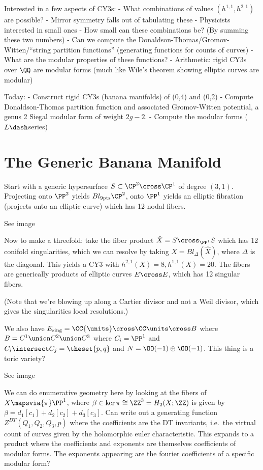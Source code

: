 Interested in a few aspects of CY3s: - What combinations of values
\((h^{1,1}, h^{2,1})\) are possible? - Mirror symmetry falls out of
tabulating these - Physicists interested in small ones - How small can
these combinations be? (By summing these two numbers) - Can we compute
the Donaldson-Thomas/Gromov-Witten/``string partition functions''
(generating functions for counts of curves) - What are the modular
properties of these functions? - Arithmetic: rigid CY3s over \(\QQ\) are
modular forms (much like Wile's theorem showing elliptic curves are
modular)

Today: - Construct rigid CY3s (banana manifolds) of (0,4) and (0,2) -
Compute Donaldson-Thomas partition function and associated Gromov-Witten
potential, a genus 2 Siegal modular form of weight \(2g-2\). - Compute
the modular forms (\(L\dash\)series)

\hypertarget{the-generic-banana-manifold}{%
\section{The Generic Banana
Manifold}\label{the-generic-banana-manifold}}

Start with a generic hypersurface \(S \subset \CP^2\cross \CP^1\) of
degree \((3,1)\). Projecting onto \(\PP^2\) yields
\(Bl_{9\text{pts}}\CP^2\), onto \(\PP^1\) yields an elliptic fibration
(projects onto an elliptic curve) which has 12 nodal fibers.

See image

Now to make a threefold: take the fiber product
\(\hat X = S \cross_{\PP^1} S\) which has 12 conifold singularities,
which we can resolve by taking \(X = Bl_\Delta(\hat X)\), where
\(\Delta\) is the diagonal. This yields a CY3 with
\(h^{2,1}(X) = 8, h^{1,1}(X) = 20\). The fibers are generically products
of elliptic curves \(E\cross E\), which has 12 singular fibers.

(Note that we're blowing up along a Cartier divisor and not a Weil
divisor, which gives the singularities local resolutions.)

We also have \(E_\text{sing} = \CC{\units}\cross \CC\units \cross B\)
where \(B=C^1 \union C^2 \union C^3\) where \(C_i = \PP^1\) and
\(C_i \intersect C_j = \theset{p,q}\) and \(N = \OO(-1)\oplus \OO(-1)\).
This thing is a toric variety?

See image

We can do enumerative geometry here by looking at the fibers of
\(X \mapsvia{\pi} \PP^1\), where
\(\beta \in \ker \pi \cong \ZZ^3 = H_2(X; \ZZ)\) is given by
\(\beta = d_1[c_1] + d_2[c_2] + d_3[c_3]\). Can write out a generating
function \(Z^{DT}(Q_1, Q_2, Q_3, p)\) where the coefficients are the DT
invariants, i.e.~the virtual count of curves given by the holomorphic
euler characteristic. This expands to a product where the coefficients
and exponents are themselves coefficients of modular forms. The
exponents appearing are the fourier coefficients of a specific modular
form?

